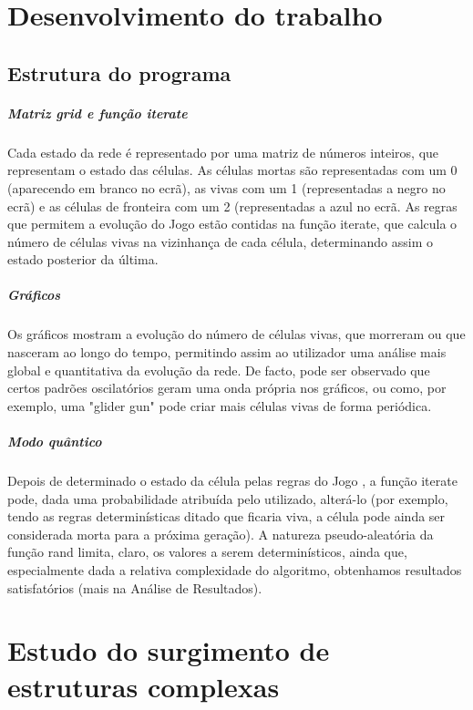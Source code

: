 \documentclass[a4paper,11pt]{book}
\begin{document}
\chapter{Desenvolvimento do trabalho}
\section{Estrutura do programa}
\paragraph{Matriz grid e função iterate} 
Cada estado da rede é representado por uma matriz de números inteiros, que representam o estado das células. As células mortas são representadas com um 0 (aparecendo em branco no ecrã), as vivas com um 1 (representadas a negro no ecrã) e as células de fronteira com um 2 (representadas a azul no ecrã. As regras que permitem a evolução do Jogo estão contidas na função iterate, que calcula o número de células vivas na vizinhança de cada célula, determinando assim o estado posterior da última.

\paragraph{Gráficos} Os gráficos mostram a evolução do número de células vivas, que morreram ou que nasceram ao longo do tempo, permitindo assim ao utilizador uma análise mais global e quantitativa da evolução da rede. De facto, pode ser observado que certos padrões oscilatórios geram uma onda própria nos gráficos, ou como, por exemplo, uma "glider gun" pode criar mais células vivas de forma periódica.

\paragraph{Modo quântico} Depois de determinado o estado da célula pelas regras do Jogo , a função iterate pode, dada uma probabilidade atribuída pelo utilizado, alterá-lo (por exemplo, tendo as regras determinísticas ditado que ficaria viva, a célula pode ainda ser considerada morta para a próxima geração). A natureza pseudo-aleatória da função rand limita, claro, os valores a serem determinísticos, ainda que, especialmente dada a relativa complexidade do algoritmo, obtenhamos resultados satisfatórios (mais na Análise de Resultados).

\chapter{Estudo do surgimento de estruturas complexas}
\end{document}

